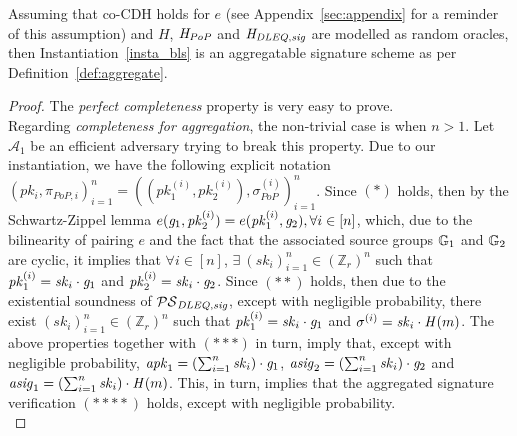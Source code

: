\begin{theorem} Assuming that co-CDH holds for $e$ (see Appendix~\ref{sec:appendix} for a reminder of this assumption) 
and $H$, $\mathit{H}_{\mathit{PoP}}$ and $\mathit{H}_{\mathit{DLEQ}, \mathit{sig}}$ are modelled as random oracles, then Instantiation~\ref{insta_bls} 
is an aggregatable signature scheme as per Definition~\ref{def:aggregate}. 
\end{theorem}
\begin{proof} The \emph{perfect completeness} property is very easy to prove. \\ 

\noindent Regarding \emph{completeness for aggregation}, the non-trivial case is when $n>1$. 
Let $\mathcal{A}_1$ be an efficient adversary trying to break this property. Due to our instantiation, 
we have the following explicit notation 
$(\mathit{pk_i}, \pi_{\mathit{PoP},i})_{i=1}^n = ((\mathit{pk_1^{(i)}}, \mathit{pk_2^{(i)}}), \sigma^{(i)}_{\mathit{PoP}})_{i=1}^n$. 
Since $(\ast)$ holds, then by the Schwartz-Zippel lemma 
$e(\mathit{g}_{1}, \mathit{pk}_2^{(i)}) = e(\mathit{pk}_1^{(i)}, \mathit{g}_{2}), \forall i \in [n]$, which, due to the bilinearity of pairing $e$ 
and the fact that the associated source groups $\mathbb{G}_{1}$ and $\mathbb{G}_{2}$ are cyclic, it implies that 
$\forall i \in [n]$, $\exists \ (\mathit{sk}_i)_{i=1}^n \in (\mathbb{Z}_r)^{n}$ such that $\mathit{pk}_1^{(i)} = \mathit{sk}_i \cdot \mathit{g}_{1}$ and 
$\mathit{pk}_2^{(i)} = \mathit{sk}_i \cdot \mathit{g}_{2}$. Since $(\ast\ast)$ holds, then due to the existential soundness of $\mathcal{PS}_{\mathit{DLEQ}, \mathit{sig}}$,  
except with negligible probability, there exist $(\mathit{sk}_i)_{i=1}^n \in (\mathbb{Z}_r)^{n}$ such that 
$\mathit{pk}_1^{(i)} = \mathit{sk}_i \cdot \mathit{g}_{1}$ and $\sigma^{(i)} = \mathit{sk}_i \cdot \mathit{H}(m)$. 
The above properties together with $(\ast\ast\ast)$ in turn, imply that, except with negligible probability, 
$\mathit{apk}_1 = (\sum_{i=1}^n \mathit{sk}_i) \cdot \mathit{g}_{1}$, $\mathit{asig}_2 = (\sum_{i=1}^n \mathit{sk}_i) \cdot \mathit{g}_{2}$ and 
$\mathit{asig}_1 = (\sum_{i=1}^n \mathit{sk}_i) \cdot \mathit{H}(m)$. This, in turn, implies that the aggregated signature verification $(\ast\ast\ast\ast)$ 
holds, except with negligible probability. \\ 


\end{proof}
